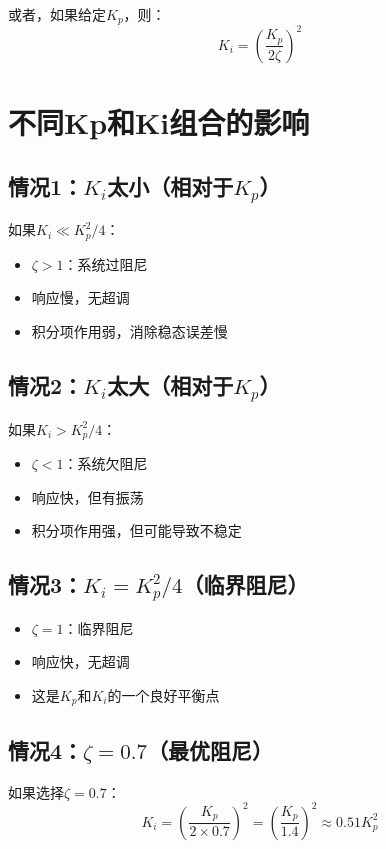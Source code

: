 \documentclass[12pt,a4paper]{article}
\begin{document}
或者，如果给定$K_p$，则：
\begin{equation}
K_i = \left(\frac{K_p}{2\zeta}\right)^2
\end{equation}

\section{不同Kp和Ki组合的影响}

\subsection{情况1：$K_i$太小（相对于$K_p$）}

如果$K_i \ll K_p^2/4$：
\begin{itemize}
\item $\zeta > 1$：系统过阻尼
\item 响应慢，无超调
\item 积分项作用弱，消除稳态误差慢
\end{itemize}

\subsection{情况2：$K_i$太大（相对于$K_p$）}

如果$K_i > K_p^2/4$：
\begin{itemize}
\item $\zeta < 1$：系统欠阻尼
\item 响应快，但有振荡
\item 积分项作用强，但可能导致不稳定
\end{itemize}

\subsection{情况3：$K_i = K_p^2/4$（临界阻尼）}

\begin{itemize}
\item $\zeta = 1$：临界阻尼
\item 响应快，无超调
\item 这是$K_p$和$K_i$的一个良好平衡点
\end{itemize}

\subsection{情况4：$\zeta = 0.7$（最优阻尼）}

如果选择$\zeta = 0.7$：
\begin{equation}
K_i = \left(\frac{K_p}{2 \times 0.7}\right)^2 = \left(\frac{K_p}{1.4}\right)^2 \approx 0.51 K_p^2
\end{equation}
\end{document}
